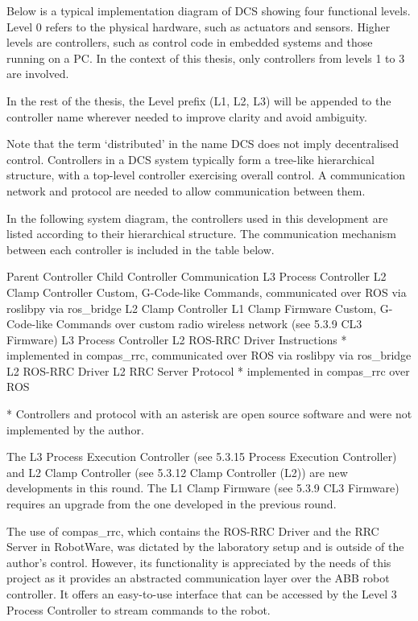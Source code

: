 Below is a typical implementation diagram of DCS showing four functional levels. Level 0 refers to the physical hardware, such as actuators and sensors. Higher levels are controllers, such as control code in embedded systems and those running on a PC. In the context of this thesis, only controllers from levels 1 to 3 are involved.

In the rest of the thesis, the Level prefix (L1, L2, L3) will be appended to the controller name wherever needed to improve clarity and avoid ambiguity.

Note that the term ‘distributed’ in the name DCS does not imply decentralised control. Controllers in a DCS system typically form a tree-like hierarchical structure, with a top-level controller exercising overall control. A communication network and protocol are needed to allow communication between them. 

In the following system diagram, the controllers used in this development are listed according to their hierarchical structure. The communication mechanism between each controller is included in the table below.

Parent Controller
Child Controller
Communication
L3 Process Controller
L2 Clamp Controller
Custom, G-Code-like Commands, communicated over ROS via roslibpy via ros_bridge
L2 Clamp Controller
L1 Clamp Firmware
Custom, G-Code-like Commands over custom radio wireless network
(see 5.3.9 CL3 Firmware)
L3 Process Controller
L2 ROS-RRC Driver 
Instructions * implemented in compas_rrc, communicated over ROS via roslibpy via ros_bridge
L2 ROS-RRC Driver 
L2 RRC Server
Protocol * implemented in compas_rrc over ROS

* Controllers and protocol with an asterisk are open source software and were not implemented by the author.

The L3 Process Execution Controller (see 5.3.15 Process Execution Controller) and L2 Clamp Controller (see 5.3.12 Clamp Controller (L2)) are new developments in this round. The L1 Clamp Firmware (see 5.3.9 CL3 Firmware) requires an upgrade from the one developed in the previous round. 

The use of compas_rrc, which contains the ROS-RRC Driver and the RRC Server in RobotWare, was dictated by the laboratory setup and is outside of the author’s control. However, its functionality is appreciated by the needs of this project as it provides an abstracted communication layer over the ABB robot controller. It offers an easy-to-use interface that can be accessed by the Level 3 Process Controller to stream commands to the robot.
